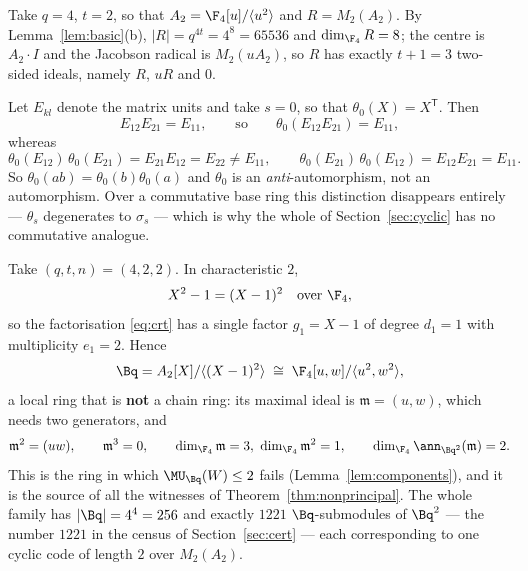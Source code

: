 \begin{example}\label{ex:ring}
Take $q=4$, $t=2$, so that $A_2=\F_4[u]/\langle u^2\rangle$ and
$R=M_2(A_2)$. By Lemma~\ref{lem:basic}(b),
$|R|=q^{4t}=4^8=65536$ and $\dim_{\F_4}R=8$; the centre is $A_2\cdot I$ and
the Jacobson radical is $M_2(uA_2)$, so $R$ has exactly $t+1=3$ two-sided
ideals, namely $R$, $uR$ and $0$.

Let $E_{kl}$ denote the matrix units and take $s=0$, so that
$\theta_0(X)=X^{\mathsf T}$. Then
\[
  E_{12}E_{21}=E_{11},\qquad\text{so}\qquad
  \theta_0(E_{12}E_{21})=E_{11},
\]
whereas
\[
  \theta_0(E_{12})\,\theta_0(E_{21})=E_{21}E_{12}=E_{22}\ne E_{11},\qquad
  \theta_0(E_{21})\,\theta_0(E_{12})=E_{12}E_{21}=E_{11}.
\]
So $\theta_0(ab)=\theta_0(b)\theta_0(a)$ and $\theta_0$ is an
\emph{anti}-automorphism, not an automorphism. Over a commutative base ring
this distinction disappears entirely --- $\theta_s$ degenerates to $\sigma_s$
--- which is why the whole of Section~\ref{sec:cyclic} has no commutative
analogue.
\end{example}

\begin{example}\label{ex:crt}
Take $(q,t,n)=(4,2,2)$. In characteristic $2$,
\[
  X^2-1=(X-1)^2\quad\text{over }\F_4,
\]
so the factorisation \eqref{eq:crt} has a single factor $g_1=X-1$ of degree
$d_1=1$ with multiplicity $e_1=2$. Hence
\[
  \Bq=A_2[X]/\langle (X-1)^2\rangle\;\cong\;\F_4[u,w]/\langle u^2,w^2\rangle,
\]
a local ring that is \textbf{not} a chain ring: its maximal ideal is
$\mathfrak m=(u,w)$, which needs two generators, and
\[
  \mathfrak m^2=(uw),\qquad \mathfrak m^3=0,\qquad
  \dim_{\F_4}\mathfrak m=3,\ \dim_{\F_4}\mathfrak m^2=1,\qquad
  \dim_{\F_4}\ann_{\Bq^2}(\mathfrak m)=2 .
\]
This is the ring in which $\MU_{\Bq}(W)\le2$ fails
(Lemma~\ref{lem:components}), and it is the source of all the witnesses of
Theorem~\ref{thm:nonprincipal}. The whole family has $|\Bq|=4^4=256$ and
exactly $1221$ $\Bq$-submodules of $\Bq^2$ --- the number $1221$ in the census
of Section~\ref{sec:cert} --- each corresponding to one cyclic code of length
$2$ over $M_2(A_2)$.
\end{example}
